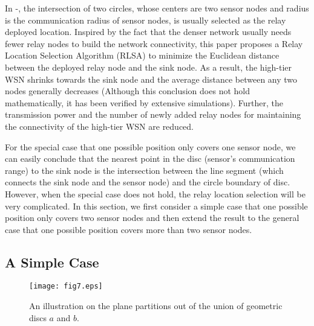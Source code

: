 \documentclass[journal]{IEEEtran}
\begin{document}
In \cite{Tang06} \cite{Ali11}-\cite{Dandekar12}, the intersection of two circles, whose centers are two sensor nodes and
radius is the communication radius of sensor nodes, is usually selected as the relay deployed location. Inspired by the fact that the denser network usually needs fewer relay nodes to build the network connectivity, this paper proposes a Relay Location Selection Algorithm (RLSA) to minimize the Euclidean distance between the deployed relay node and the sink node.  As a result, the high-tier WSN shrinks towards the sink node and the average distance between any two nodes generally decreases (Although this conclusion does not hold mathematically, it has been verified by extensive simulations). Further, the transmission power and the number of newly added relay nodes for maintaining the connectivity of the high-tier WSN are reduced.


For the special case that one possible position only covers one sensor node, we can easily conclude that the nearest point in the disc (sensor's communication range) to the sink node is the intersection between the line segment (which connects the sink node and the sensor node) and the circle boundary of disc. However, when the special case does not hold, the relay location selection will be very complicated. In this section, we first consider a simple case that one possible position only covers two sensor nodes and then extend the result to the general case that one possible position covers more than two sensor nodes.
\subsection{A Simple Case}
\begin{figure}
\begin{center}
\texttt{[image: fig7.eps]}    \caption{An illustration on the plane partitions out of the union of geometric discs $a$ and $b$.}
\label{fig7}                                 \end{center}                                 \end{figure}
\end{document}
